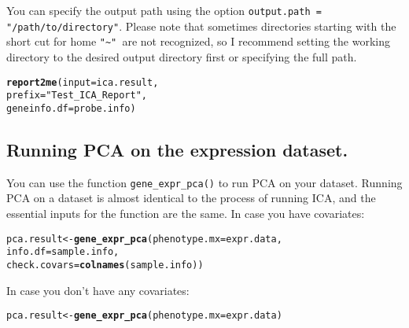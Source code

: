 \documentclass[11pt, oneside]{article}\usepackage[]{graphicx}\usepackage[]{color}
\makeatletter
\newcommand{\hlstr}[1]{\textcolor[rgb]{0.192,0.494,0.8}{#1}}%
\newcommand{\hlstd}[1]{\textcolor[rgb]{0.345,0.345,0.345}{#1}}%
\newcommand{\hlkwb}[1]{\textcolor[rgb]{0.69,0.353,0.396}{#1}}%
\newcommand{\hlkwc}[1]{\textcolor[rgb]{0.333,0.667,0.333}{#1}}%
\newcommand{\hlkwd}[1]{\textcolor[rgb]{0.737,0.353,0.396}{\textbf{#1}}}%
\newenvironment{kframe}{%
 \def\at@end@of@kframe{}%
 \ifinner\ifhmode%
  \def\at@end@of@kframe{\end{minipage}}%
  \begin{minipage}{\columnwidth}%
 \fi\fi%
 \def\FrameCommand##1{\hskip\@totalleftmargin \hskip-\fboxsep
 \colorbox{shadecolor}{##1}\hskip-\fboxsep
     \hskip-\linewidth \hskip-\@totalleftmargin \hskip\columnwidth}%
 \MakeFramed {\advance\hsize-\width
   \@totalleftmargin\z@ \linewidth\hsize
   \@setminipage}}%
 {\par\unskip\endMakeFramed%
 \at@end@of@kframe}
\newenvironment{knitrout}{}{} %
\makeatother
\begin{document}
You can specify the output path using the option \verb|output.path = "/path/to/directory"|. Please note that sometimes directories starting with the short cut for home \verb|"~" |are not recognized, so I recommend setting the working directory to the desired output directory first or specifying the full path. 

\begin{knitrout}
\color{fgcolor}\begin{kframe}
\begin{alltt}
\hlkwd{report2me}\hlstd{(}\hlkwc{input} \hlstd{= ica.result,}
          \hlkwc{prefix} \hlstd{=} \hlstr{"Test_ICA_Report"}\hlstd{,}
          \hlkwc{geneinfo.df} \hlstd{= probe.info)}
\end{alltt}
\end{kframe}
\end{knitrout}

\subsection{Running PCA on the expression dataset.}

You can use the function \verb|gene_expr_pca()| to run PCA on your dataset. Running PCA on a dataset is almost identical to the process of running ICA, and the essential inputs for the function are the same. In case you have covariates:

\begin{knitrout}
\color{fgcolor}\begin{kframe}
\begin{alltt}
\hlstd{pca.result} \hlkwb{<-} \hlkwd{gene_expr_pca}\hlstd{(}\hlkwc{phenotype.mx} \hlstd{= expr.data,}
                            \hlkwc{info.df} \hlstd{= sample.info,}
                            \hlkwc{check.covars} \hlstd{=} \hlkwd{colnames}\hlstd{(sample.info))}
\end{alltt}


{\ttfamily\noindent\bfseries{}}\end{kframe}
\end{knitrout}

In case you don't have any covariates:

\begin{knitrout}
\color{fgcolor}\begin{kframe}
\begin{alltt}
\hlstd{pca.result} \hlkwb{<-} \hlkwd{gene_expr_pca}\hlstd{(}\hlkwc{phenotype.mx} \hlstd{= expr.data)}
\end{alltt}
\end{kframe}
\end{knitrout}
\end{document}
